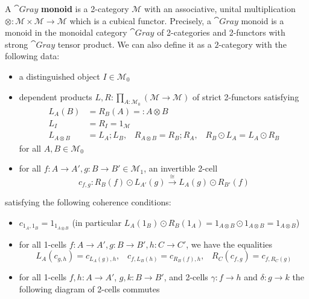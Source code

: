 \begin{defn}{}
    A $\cat{Gray}$ \textbf{monoid} is a 2-category $\mathcal{M}$ with an associative, unital multiplication $\otimes:\mathcal{M}\times \mathcal{M}\rightarrow \mathcal{M}$ which is a cubical functor. Precisely, a $\cat{Gray}$ monoid is a monoid in the monoidal category $\cat{Gray}$ of 2-categories and 2-functors with strong $\cat{Gray}$ tensor product. We can also define it as a $2$-category with the following data:
    \begin{itemize}
        \item a distinguished object $I \in \mathcal{M}_0$
        \item dependent products $L,R:\prod_{A:\mathcal{M}_0}(\mathcal{M}\rightarrow \mathcal{M})$ of strict 2-functors satisfying
        \begin{align*}
            L_A(B) &= R_B(A) =:A\otimes B \\
            L_I &= R_I = 1_{\mathcal{M}} \\
            L_{A\otimes B} &= L_A;L_B,\;\;\;R_{A\otimes B} = R_B;R_A,\;\;\;R_B\odot L_A=L_A\odot R_B
        \end{align*}
        for all $A,B \in \mathcal{M}_0$
        \item for all $f:A\rightarrow A',g:B\rightarrow B'\in \mathcal{M}_1$, an invertible 2-cell
        \begin{equation*}
            c_{f,g}: R_B(f)\odot L_{A'}(g)\xrightarrow{\cong}  L_A(g)\odot R_{B'}(f)
        \end{equation*}
    \end{itemize}
    satisfying the following coherence conditions:
    \begin{itemize}
        \item $c_{1_A,1_B} = 1_{1_{A\otimes B}}$ (in particular $L_A(1_B)\odot R_B(1_A) = 1_{A\otimes B}\odot 1_{A\otimes B} = 1_{A\otimes B}$)
        \item for all 1-cells $f:A\rightarrow A', g:B\rightarrow B', h:C\rightarrow C'$, we have the equalities
        \begin{equation*}
            L_A(c_{g,h}) = c_{L_A(g),h},\;\;\; c_{f,L_B(h)} = c_{R_B(f),h},\;\;\;R_C(c_{f,g})=c_{f,R_C(g)}
        \end{equation*}
        \item for all 1-cells $f,h:A\rightarrow A'$, $g,k:B\rightarrow B'$, and 2-cells $\gamma:f\rightarrow h$ and $\delta:g\rightarrow k$ the following diagram of 2-cells commutes
        \[\begin{tikzcd}

\end{tikzcd}\]
\end{itemize}
\end{defn}
